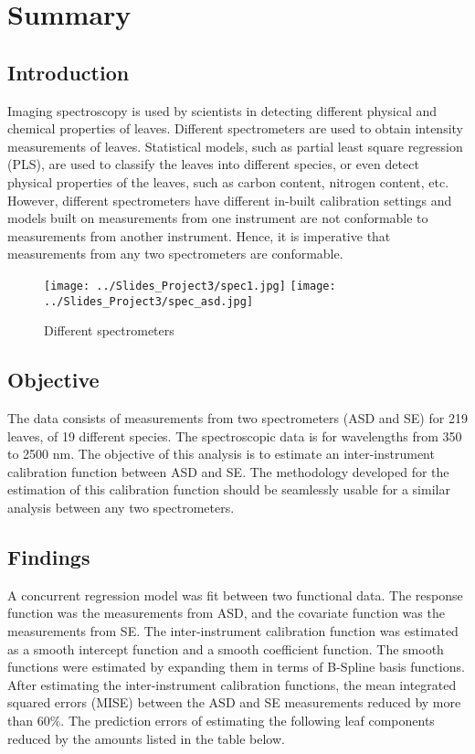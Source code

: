 \section*{Summary} \label{Sec_Summary}
\subsection*{Introduction}
Imaging spectroscopy is used by scientists in detecting different physical and chemical properties of leaves. Different spectrometers are used to obtain intensity measurements of leaves. Statistical models, such as partial least square regression (PLS), are used to classify the leaves into different species, or even detect physical properties of the leaves, such as carbon content, nitrogen content, etc. However, different spectrometers have different in-built calibration settings and models built on measurements from one instrument are not conformable to measurements from another instrument. Hence, it is imperative that measurements from any two spectrometers are conformable. 

\begin{figure}[H]
\centering
\texttt{[image: ../Slides\_Project3/spec1.jpg]}
\hspace{1cm}
\texttt{[image: ../Slides\_Project3/spec\_asd.jpg]}
\caption{Different spectrometers}
\label{fig:Fig1.1}
\end{figure}

\subsection*{Objective}
The data consists of measurements from two spectrometers (ASD and SE) for 219 leaves, of 19 different species. The spectroscopic data is for wavelengths from 350 to 2500 nm. The objective of this analysis is to estimate an inter-instrument calibration function between ASD and SE. The methodology developed for the estimation of this calibration function should be seamlessly usable for a similar analysis between any two spectrometers. 

\subsection*{Findings}
A concurrent regression model was fit between two functional data. The response function was the measurements from ASD, and the covariate function was the measurements from SE. The inter-instrument calibration function was estimated as a smooth intercept function and a smooth coefficient function. The smooth functions were estimated by expanding them in terms of B-Spline basis functions. After estimating the inter-instrument calibration functions, the mean integrated squared errors (MISE) between the ASD and SE measurements reduced by more than $60\%$. The prediction errors of estimating the following leaf components reduced by the amounts listed in the table below. 

 
